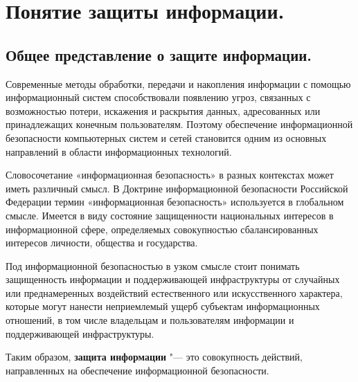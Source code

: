 \section{Понятие защиты информации.}
\subsection{Общее представление о защите информации.}
Современные методы обработки, передачи и накопления информации с помощью информационный систем способствовали 
появлению угроз, связанных с возможностью потери, искажения и раскрытия данных, адресованных или принадлежащих 
конечным пользователям. Поэтому обеспечение информационной безопасности компьютерных систем и сетей становится 
одним из основных направлений в области информационных технологий\cite{sh}.

Словосочетание «информационная безопасность» в разных контекстах может иметь различный смысл. В Доктрине информационной
безопасности Российской Федерации термин «информационная безопасность» используется в глобальном смысле. Имеется в виду 
состояние защищенности национальных интересов в информационной сфере, определяемых совокупностью сбалансированных интересов 
личности, общества и государства. 

Под информационной безопасностью в узком смысле стоит понимать защищенность информации и поддерживающей инфраструктуры от 
случайных или преднамеренных воздействий естественного или искусственного характера, которые могут нанести неприемлемый ущерб 
субъектам информационных отношений, в том числе владельцам и пользователям информации и поддерживающей инфраструктуры. 

Таким образом, \textbf{защита информации} "---  это совокупность действий, направленных на обеспечение информационной безопасности\cite{untuit}.

